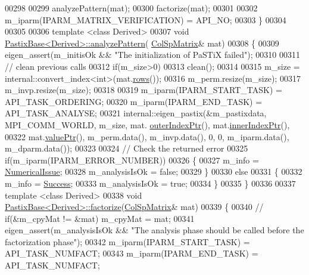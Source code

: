 \begin{DoxyCode}
00298   
00299   analyzePattern(mat);  
00300   factorize(mat);
00301   
00302   m\_iparm(IPARM\_MATRIX\_VERIFICATION) = API\_NO;
00303 \}
00304 
00305 
00306 \textcolor{keyword}{template} <\textcolor{keyword}{class} Derived>
00307 \textcolor{keywordtype}{void} \hyperlink{class_eigen_1_1_pastix_base}{PastixBase<Derived>::analyzePattern}(
      \hyperlink{group___sparse_core___module}{ColSpMatrix}& mat)
00308 \{                         
00309   eigen\_assert(m\_initisOk && \textcolor{stringliteral}{"The initialization of PaSTiX failed"});
00310   
00311   \textcolor{comment}{// clean previous calls}
00312   \textcolor{keywordflow}{if}(m\_size>0)
00313     clean();
00314   
00315   m\_size = internal::convert\_index<int>(mat.\hyperlink{group___sparse_core___module_a62e61bb861eee306d5b069ce652b5aa5}{rows}());
00316   m\_perm.resize(m\_size);
00317   m\_invp.resize(m\_size);
00318   
00319   m\_iparm(IPARM\_START\_TASK) = API\_TASK\_ORDERING;
00320   m\_iparm(IPARM\_END\_TASK) = API\_TASK\_ANALYSE;
00321   internal::eigen\_pastix(&m\_pastixdata, MPI\_COMM\_WORLD, m\_size, mat.
      \hyperlink{group___sparse_core___module_a75506964d86d6badb32d0b4917acf2e2}{outerIndexPtr}(), mat.\hyperlink{group___sparse_core___module_ae7b804bd39745156d20ca1611a296b67}{innerIndexPtr}(),
00322                mat.\hyperlink{group___sparse_core___module_a9d4354d3f4d121d764bbed33cac05329}{valuePtr}(), m\_perm.data(), m\_invp.data(), 0, 0, m\_iparm.data(), m\_dparm.data());
00323   
00324   \textcolor{comment}{// Check the returned error}
00325   \textcolor{keywordflow}{if}(m\_iparm(IPARM\_ERROR\_NUMBER))
00326   \{
00327     m\_info = \hyperlink{group__enums_gga85fad7b87587764e5cf6b513a9e0ee5eaaf9b736d310a664e7729d163a035cc5f}{NumericalIssue};
00328     m\_analysisIsOk = \textcolor{keyword}{false};
00329   \}
00330   \textcolor{keywordflow}{else}
00331   \{ 
00332     m\_info = \hyperlink{group__enums_gga85fad7b87587764e5cf6b513a9e0ee5ea52581b035f4b59c203b8ff999ef5fcea}{Success};
00333     m\_analysisIsOk = \textcolor{keyword}{true};
00334   \}
00335 \}
00336 
00337 \textcolor{keyword}{template} <\textcolor{keyword}{class} Derived>
00338 \textcolor{keywordtype}{void} \hyperlink{class_eigen_1_1_pastix_base}{PastixBase<Derived>::factorize}(\hyperlink{group___sparse_core___module}{ColSpMatrix}& mat)
00339 \{
00340 \textcolor{comment}{//   if(&m\_cpyMat != &mat) m\_cpyMat = mat;}
00341   eigen\_assert(m\_analysisIsOk && \textcolor{stringliteral}{"The analysis phase should be called before the factorization phase"});
00342   m\_iparm(IPARM\_START\_TASK) = API\_TASK\_NUMFACT;
00343   m\_iparm(IPARM\_END\_TASK) = API\_TASK\_NUMFACT;

\end{DoxyCode}

